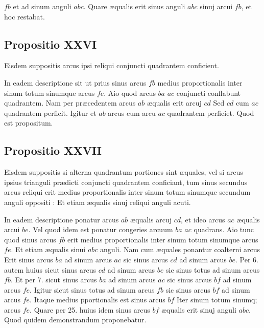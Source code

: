 \documentclass[11pt,a4paper]{article}
\begin{document}
$fb$ et ad sinum anguli $abc$. Quare æqualis erit sinus anguli $abc$ sinuj arcui $fb$, et hoc restabat.

\subsection*{Propositio XXVI}

Eisdem suppositis arcus ipsi reliqui conjuncti quadrantem conficient.

In eadem descriptione sit ut prius sinus arcus $fb$ medius proportionalis inter sinum totum sinumque arcus $fe$. Aio quod arcus $ba$ $ac$ conjuncti conflabunt quadrantem. Nam per præcedentem arcus $ab$ æqualis erit arcuj $cd$ Sed $cd$ cum $ac$ quadrantem perficit. Igitur et $ab$ arcus cum arcu $ac$ quadrantem perficiet. Quod est propositum.

\subsection*{Propositio XXVII}

Eisdem suppositis si alterna quadrantum portiones sint æquales, vel si arcus ipsius trianguli prædicti conjuncti quadrantem conficiant, tum sinus secundus arcus reliqui erit medius proportionalis inter sinum totum sinumque secundum anguli oppositi : Et etiam æqualis sinuj reliqui anguli acuti.

In eadem descriptione ponatur arcus $ab$ æqualis arcuj $cd$, et ideo arcus $ac$ æqualis arcui $be$. Vel quod idem est ponatur congeries arcuum $ba$ $ac$ quadrans. Aio tunc quod sinus arcus $fb$ erit medius proportionalis inter sinum totum sinumque arcus $fe$. Et etiam æqualis sinui $abc$ anguli. Nam cum æquales ponantur coalterni arcus Erit sinus arcus $ba$ ad sinum arcus $ac$ sic sinus arcus $cd$ ad sinum arcus $be$. Per 6. autem huius sicut sinus arcus $cd$ ad sinum arcus $be$ sic sinus totus ad sinum arcus $fb$. Et per 7. sicut sinus arcus $ba$ ad sinum arcus $ac$ sic sinus arcus $bf$ ad sinum arcus $fe$. Igitur sicut sinus totus ad sinum arcus $fb$ sic sinus arcus $bf$ ad sinum arcus $fe$. Itaque medius p̄portionalis est sinus arcus $bf$ Iter sinum totum sinumq; arcus $fe$. Quare per 25. huius idem sinus arcus $bf$ æqualis erit sinuj anguli $abc$. Quod quidem demonstrandum proponebatur.
\end{document}
